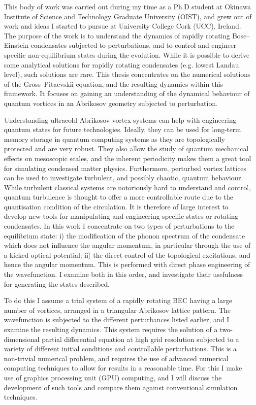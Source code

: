 
This body of work was carried out during my time as a Ph.D student at Okinawa Institute of Science and Technology Graduate University (OIST), and grew out of work and ideas I started to pursue at University College Cork (UCC), Ireland. The purpose of the work is to understand the dynamics of rapidly rotating Bose--Einstein condensates subjected to perturbations, and to control and engineer specific non-equilibrium states during the evolution. While it is possible to derive some analytical solutions for rapidly rotating condensates (e.g. lowest Landau level), such solutions are rare. This thesis concentrates on the numerical solutions of the Gross--Pitaevskii equation, and the resulting dynamics within this framework. It focuses on gaining an understanding of the dynamical behaviour of quantum vortices in an Abrikosov geometry subjected to perturbation. %

Understanding ultracold Abrikosov vortex systems can help with engineering quantum states for future technologies. Ideally, they can be used for long-term memory storage in quantum computing systems as they are topologically protected and are very robust. They also allow the study of quantum mechanical effects on mesoscopic scales, and the inherent periodicity makes them a great tool for simulating condensed matter physics. Furthermore, perturbed vortex lattices can be used to investigate turbulent, and possibly chaotic, quantum behaviour. While turbulent classical systems are notoriously hard to understand and control, quantum turbulence is thought to offer a more controllable route due to the quantisation condition of the circulation. It is therefore of large interest to develop new tools for manipulating and engineering specific states or rotating condensates. In this work I concentrate on two types of perturbations to the equilibrium state: i) the modification of the phonon spectrum of the condensate which does not influence the angular momentum, in particular through the use of a kicked optical potential; ii) the direct control of the topological excitations, and hence the angular momentum. This is performed with direct phase engineering of the wavefunction. I examine both in this order, and investigate their usefulness for generating the states described.

To do this I assume a trial system of a rapidly rotating BEC having a large number of vortices, arranged in a triangular Abrikosov lattice pattern. The wavefunction is subjected to the different perturbances listed earlier, and I examine the resulting dynamics. This system requires the solution of a two-dimensional partial differential equation at high grid resolution subjected to a variety of different initial conditions and controllable perturbations. This is a non-trivial numerical problem, and requires the use of advanced numerical computing techniques to allow for results in a reasonable time. For this I make use of graphics processing unit (GPU) computing, and I will discuss the development of such tools and compare them against conventional simulation techniques.

